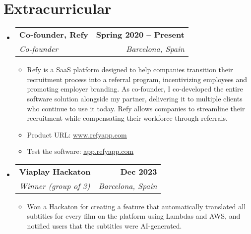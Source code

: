 \documentclass[letterpaper,11pt]{article}
\makeatletter
\newcommand{\resumeItem}[1]{
  \item\small{
    {#1 \vspace{-2pt}}
  }
}
\newcommand{\resumeSubheading}[4]{
  \vspace{-2pt}\item
    \begin{tabular*}{1.0\textwidth}[t]{l@{\extracolsep{\fill}}r}
      \textbf{#1} & \textbf{\small #2} \\
      \textit{\small#3} & \textit{\small #4} \\
    \end{tabular*}\vspace{-7pt}
}
\newcommand{\resumeSubHeadingListStart}{\begin{itemize}[leftmargin=0.0in, label={}]}
\newcommand{\resumeSubHeadingListEnd}{\end{itemize}}
\newcommand{\resumeItemListStart}{\begin{itemize}}
\newcommand{\resumeItemListEnd}{\end{itemize}\vspace{-5pt}}
\makeatother
\begin{document}
\section{Extracurricular}
    \resumeSubHeadingListStart
        \resumeSubheading{Co-founder, Refy}{Spring 2020 -- Present}{Co-founder}{Barcelona, Spain}
            \resumeItemListStart
                \resumeItem{Refy is a SaaS platform designed to help companies transition their recruitment process into a referral program, incentivizing employees and promoting employer branding. As co-founder, I co-developed the entire software solution alongside my partner, delivering it to multiple clients who continue to use it today. Refy allows companies to streamline their recruitment while compensating their workforce through referrals.}
                \resumeItem{Product URL: \href{https://refyapp.com}{\underline{www.refyapp.com}}}
                \resumeItem{Test the software: \href{https://porsche.com}{\underline{app.refyapp.com}}}
            \resumeItemListEnd
        \resumeSubheading{Viaplay Hackaton}{Dec 2023}{Winner (group of 3)}{Barcelona, Spain}
            \resumeItemListStart
                \resumeItem{Won a \href{https://www.linkedin.com/posts/sergifalcon_viaplaygroup-hackdays-innovation-activity-7137177587486797824-XEoG}{\underline{Hackaton}} for creating a feature that automatically translated all subtitles for every film on the platform using Lambdas and AWS, and notified users that the subtitles were AI-generated.}
            \resumeItemListEnd
        
    \resumeSubHeadingListEnd
\end{document}
